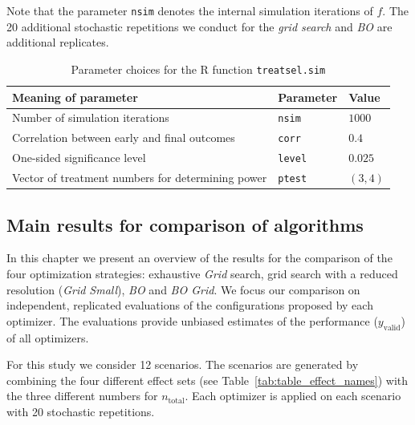 \documentclass[bimj,fleqn]{w-art}
\theoremstyle{plain}
\theoremstyle{definition}
\begin{document}
Note that the parameter \texttt{nsim} denotes the internal simulation iterations of $f$. 
The 20 additional stochastic repetitions we conduct for the \emph{grid search} and \emph{BO} are additional replicates.


\begin{table}[h]
  \caption{Parameter choices for the R function \texttt{treatsel.sim}}
  \label{tab:par_implement}
  \centering
  \begin{tabular}{lll}
  \hline
  Meaning of parameter & Parameter & Value \\
  \hline
  Number of simulation iterations & \texttt{nsim} & $1000$ \\
  Correlation between early and final outcomes & \texttt{corr} & $0.4$ \\
  One-sided significance level & \texttt{level} & $0.025$ \\
  Vector of treatment numbers for determining power & \texttt{ptest} & $(3,4)$ \\
  \hline
  \end{tabular}
\end{table}

\subsection{Main results for comparison of algorithms}

In this chapter we present an overview of the results for the comparison of the four optimization strategies: exhaustive \emph{Grid} search, grid search with a reduced resolution (\emph{Grid Small}), \emph{BO} and \emph{BO Grid}.
We focus our comparison on independent, replicated evaluations of the configurations proposed by each optimizer.
The evaluations provide unbiased estimates of the performance ($y_{\text{valid}}$) of all optimizers.

For this study we consider 12 scenarios.
The scenarios are generated by combining the four different effect sets (see Table~\ref{tab:table_effect_names}) with the three different numbers for $n_{\text{total}}$.
Each optimizer is applied on each scenario with 20 stochastic repetitions.
\end{document}
